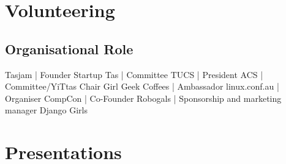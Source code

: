 \documentclass[a4paper]{deedy-resume} %
\begin{document}
\begin{minipage}[t]{0.33\textwidth}
\sectionspace %


\section{Volunteering}

\subsection{Organisational Role}
Tasjam | Founder \textbullet{} Startup Tas | Committee \textbullet{} TUCS | President \textbullet{}
ACS | Committee/YiTtas Chair \textbullet{} Girl Geek Coffees | Ambassador \textbullet{}
linux.conf.au | Organiser \textbullet{} CompCon | Co-Founder \textbullet{}
Robogals | Sponsorship and marketing manager \textbullet{} Django Girls \\




\sectionspace %


\section{Presentations}


\end{minipage}
\end{document}
